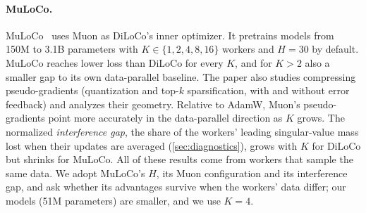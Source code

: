 \documentclass{article}
\begin{document}
\paragraph{MuLoCo.} MuLoCo~\cite{therien2025muloco} uses Muon as DiLoCo's inner optimizer. It pretrains models from 150M to 3.1B parameters with $K \in \{1,2,4,8,16\}$ workers and $H=30$ by default. MuLoCo reaches lower loss than DiLoCo for every $K$, and for $K>2$ also a smaller gap to its own data-parallel baseline. The paper also studies compressing pseudo-gradients (quantization and top-$k$ sparsification, with and without error feedback) and analyzes their geometry. Relative to AdamW, Muon's pseudo-gradients point more accurately in the data-parallel direction as $K$ grows. The normalized \emph{interference gap}, the share of the workers' leading singular-value mass lost when their updates are averaged (\cref{sec:diagnostics}), grows with $K$ for DiLoCo but shrinks for MuLoCo. All of these results come from workers that sample the same data. We adopt MuLoCo's $H$, its Muon configuration and its interference gap, and ask whether its advantages survive when the workers' data differ; our models (51M parameters) are smaller, and we use $K=4$.
\end{document}
